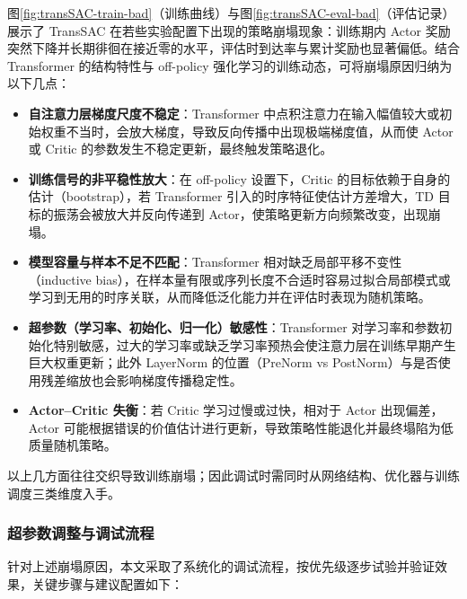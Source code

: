 图\ref{fig:transSAC-train-bad}（训练曲线）与图\ref{fig:transSAC-eval-bad}（评估记录）展示了 TransSAC 在若些实验配置下出现的策略崩塌现象：训练期内 Actor 奖励突然下降并长期徘徊在接近零的水平，评估时到达率与累计奖励也显著偏低。结合 Transformer 的结构特性与 off-policy 强化学习的训练动态，可将崩塌原因归纳为以下几点：

\begin{itemize}
    \item \textbf{自注意力层梯度尺度不稳定}：Transformer 中点积注意力在输入幅值较大或初始权重不当时，会放大梯度，导致反向传播中出现极端梯度值，从而使 Actor 或 Critic 的参数发生不稳定更新，最终触发策略退化。
    \item \textbf{训练信号的非平稳性放大}：在 off-policy 设置下，Critic 的目标依赖于自身的估计（bootstrap），若 Transformer 引入的时序特征使估计方差增大，TD 目标的振荡会被放大并反向传递到 Actor，使策略更新方向频繁改变，出现崩塌。
    \item \textbf{模型容量与样本不足不匹配}：Transformer 相对缺乏局部平移不变性（inductive bias），在样本量有限或序列长度不合适时容易过拟合局部模式或学习到无用的时序关联，从而降低泛化能力并在评估时表现为随机策略。
    \item \textbf{超参数（学习率、初始化、归一化）敏感性}：Transformer 对学习率和参数初始化特别敏感，过大的学习率或缺乏学习率预热会使注意力层在训练早期产生巨大权重更新；此外 LayerNorm 的位置（PreNorm vs PostNorm）与是否使用残差缩放也会影响梯度传播稳定性。
    \item \textbf{Actor–Critic 失衡}：若 Critic 学习过慢或过快，相对于 Actor 出现偏差，Actor 可能根据错误的价值估计进行更新，导致策略性能退化并最终塌陷为低质量随机策略。
\end{itemize}

以上几方面往往交织导致训练崩塌；因此调试时需同时从网络结构、优化器与训练调度三类维度入手。

\subsubsection{超参数调整与调试流程}

针对上述崩塌原因，本文采取了系统化的调试流程，按优先级逐步试验并验证效果，关键步骤与建议配置如下：

